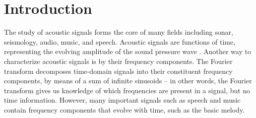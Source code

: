\documentclass[letter,12pt,notitlepage]{article}
\title{\ThesisTitle}
\author{\vspace{1em}\\Sevag Hanssian \\
  McGill University \\
 \small{\texttt{sevag.hanssian@mail.mcgill.ca}} \\
 \small{\texttt{sevagh@protonmail.com}} \\\ \\\ \\
 \small{Thesis for Master of Arts in Music Technology}\\
 \small{Date TBD, 2021}}
\date{}
\begin{document}
\maketitle

\vspace{3.5em}

\begin{abstract}
	The short-time Fourier transform (STFT) is an important tool for the time-frequency analysis of acoustic signals. The STFT is commonly used as the input representation of music signals in deep learning models. Examples of music information retrieval (MIR) tasks where such models have achieved success are onset detection and music source separation. Despite its ubiquity, the STFT has a fixed and bounded time-frequency resolution, such that one must sacrifice time for frequency resolution (or vice versa) by changing the window size. The Nonstationary Gabor Transform (NSGT) is an adaptive time-frequency transform which can vary its time-frequency resolution to better represent music signals. In this thesis, first the STFT and NSGT are described as tools for representing and manipulating music signals. Next, the STFT is replaced with different configurations of the NSGT in deep learning models for onset detection and music source separation respectively, showing significant improvements in the results.
\end{abstract}

\vfill
\clearpage %

\tableofcontents

\vfill
\clearpage %

\listoffigures

\listoflistings

\vfill
\clearpage %

\section{Introduction}
\label{sec:intro}

The study of acoustic signals forms the core of many fields including sonar, seismology, audio, music, and speech. Acoustic signals are functions of time, representing the evolving amplitude of the sound pressure wave . Another way to characterize acoustic signals is by their frequency components. The Fourier transform decomposes time-domain signals into their constituent frequency components, by means of a sum of infinite sinusoids -- in other words, the Fourier transform gives us knowledge of which frequencies are present in a signal, but no time information. However, many important signals such as speech and music contain frequency components that evolve with time, such as the basic melody.
\end{document}

